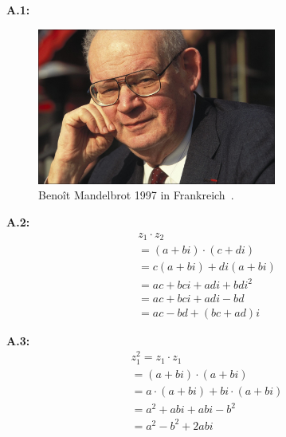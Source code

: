 \renewcommand{\thesection}{A}
\pagestyle{appendix}
\newcommand{\figuretag}[1]{%
  \addtocounter{figure}{-1}%
  \renewcommand{\thefigure}{#1}%
}

\noindent\textbf{A.1:}\label{app:1}
\begin{figure}[H]\figuretag{A.1}
\centering
\includegraphics[width=0.7\textwidth]{images/benoit-mandelbrot}
\caption{Benoît Mandelbrot 1997 in Frankreich~\cite{gaillarde_benoit_1997}.}
\label{fig:benoit-mandelbrot-picture}
\end{figure}

\noindent\textbf{A.2:}\label{app:2}
\begin{equation}\tag{A.2}\label{eq:complex-numbers-multiplication}
  \begin{split}
    z_1 \cdot z_2 \\
    = (a + bi) \cdot (c + di) \\
    =  c(a + bi) + di(a + bi) \\
    = ac + bci + adi + bdi^2 \\
    = ac + bci + adi - bd \\
    = ac - bd +(bc + ad)i
  \end{split}
\end{equation}

\noindent\textbf{A.3:}\label{app:3}
\begin{equation}\tag{A.3}\label{eq:complex-numbes-squaring}
  \begin{split}
    z_1^2
    = z_1 \cdot z_1 \\
    = (a + bi) \cdot (a + bi) \\
    = a \cdot (a + bi) + bi \cdot (a + bi) \\
    = a^2 + abi + abi - b^2 \\
    = a^2 - b^2 + 2abi
  \end{split}
\end{equation}

